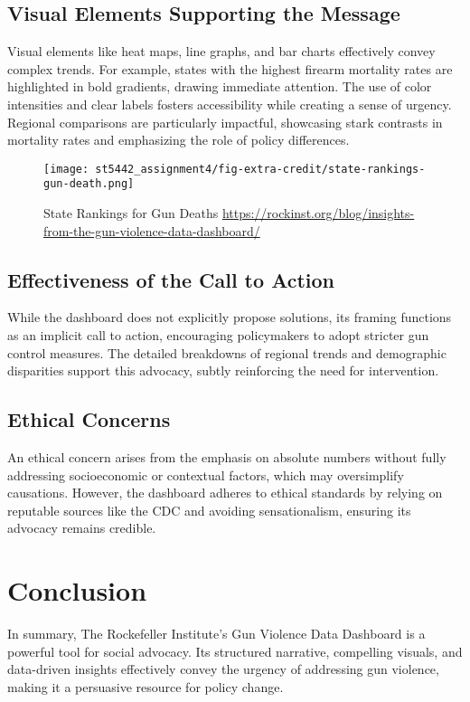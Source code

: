 \documentclass{article}
\begin{document}
\subsection{Visual Elements Supporting the Message}

Visual elements like heat maps, line graphs, and bar charts effectively convey complex trends. For example, states with the highest firearm mortality rates are highlighted in bold gradients, drawing immediate attention. The use of color intensities and clear labels fosters accessibility while creating a sense of urgency. Regional comparisons are particularly impactful, showcasing stark contrasts in mortality rates and emphasizing the role of policy differences.

\begin{figure}[ht] %
    \centering
    \texttt{[image: st5442\_assignment4/fig-extra-credit/state-rankings-gun-death.png]}
    \caption{
        State Rankings for Gun Deaths \url{https://rockinst.org/blog/insights-from-the-gun-violence-data-dashboard/}
    }
    \label{fig:fig1}
\end{figure}

\subsection{Effectiveness of the Call to Action} 
While the dashboard does not explicitly propose solutions, its framing functions as an implicit call to action, encouraging policymakers to adopt stricter gun control measures. The detailed breakdowns of regional trends and demographic disparities support this advocacy, subtly reinforcing the need for intervention.

\subsection{Ethical Concerns} 
An ethical concern arises from the emphasis on absolute numbers without fully addressing socioeconomic or contextual factors, which may oversimplify causations. However, the dashboard adheres to ethical standards by relying on reputable sources like the CDC and avoiding sensationalism, ensuring its advocacy remains credible.

\section{Conclusion}

In summary, The Rockefeller Institute's Gun Violence Data Dashboard is a powerful tool for social advocacy. Its structured narrative, compelling visuals, and data-driven insights effectively convey the urgency of addressing gun violence, making it a persuasive resource for policy change.

\begin{refcontext}[sorting=nyt]
\printbibliography
\end{refcontext}
\end{document}
